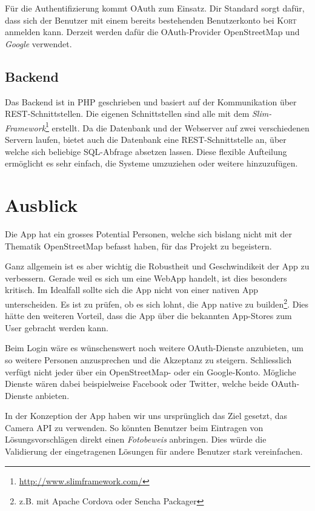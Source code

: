 Für die Authentifizierung kommt \gls{OAuth} zum Einsatz.
Dir Standard sorgt dafür, dass sich der Benutzer mit einem bereits bestehenden Benutzerkonto bei \textsc{Kort} anmelden kann.
Derzeit werden dafür die \gls{OAuth}-Provider \gls{OpenStreetMap} und \emph{Google} verwendet.

\subsection*{Backend}
Das Backend ist in PHP geschrieben und basiert auf der Kommunikation über \gls{REST}-Schnittstellen.
Die eigenen Schnittstellen sind alle mit dem \emph{Slim-Framework}\footnote{\url{http://www.slimframework.com/}} erstellt.
Da die Datenbank und der Webserver auf zwei verschiedenen Servern laufen, bietet auch die Datenbank eine \gls{REST}-Schnittstelle an, über welche sich beliebige SQL-Abfrage absetzen lassen.
Diese flexible Aufteilung ermöglicht es sehr einfach, die Systeme umzuziehen oder weitere hinzuzufügen.

\section*{Ausblick}
Die App hat ein grosses Potential Personen, welche sich bislang nicht mit der Thematik \gls{OpenStreetMap} befasst haben, für das Projekt zu begeistern.

Ganz allgemein ist es aber wichtig die Robustheit und Geschwindikeit der App zu verbessern. 
Gerade weil es sich um eine \gls{WebApp} handelt, ist dies besonders kritisch. 
Im Idealfall sollte sich die App nicht von einer nativen App unterscheiden.
Es ist zu prüfen, ob es sich lohnt, die App native zu builden\footnote{z.B. mit Apache Cordova oder Sencha Packager}.
Dies hätte den weiteren Vorteil, dass die App über die bekannten \glspl{App-Store} zum User gebracht werden kann.

Beim Login wäre es wünschenswert noch weitere \gls{OAuth}-Dienste anzubieten, um so weitere Personen anzusprechen und die Akzeptanz zu steigern.
Schliesslich verfügt nicht jeder über ein \gls{OpenStreetMap}- oder ein Google-Konto.
Mögliche Dienste wären dabei beispielweise Facebook oder Twitter, welche beide \gls{OAuth}-Dienste anbieten.

In der Konzeption der App haben wir uns ursprünglich das Ziel gesetzt, das \gls{Camera API} zu verwenden. 
So könnten Benutzer beim Eintragen von Lösungsvorschlägen direkt einen \emph{Fotobeweis} anbringen. 
Dies würde die Validierung der eingetragenen Lösungen für andere Benutzer stark vereinfachen.

